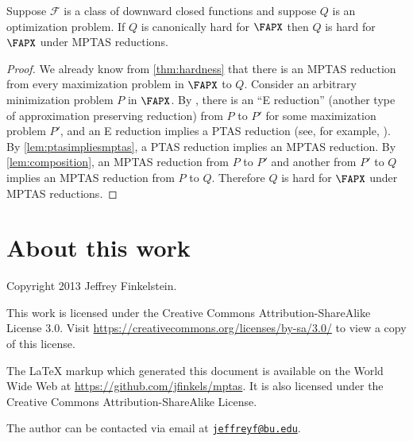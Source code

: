 \documentclass{article}
\newcommand{\email}[1]{\href{mailto:#1}{\nolinkurl{#1}}}
\begin{document}
\begin{corollary}[{\cite[Theorem~3]{ep06}}]
  Suppose $\mathcal{F}$ is a class of downward closed functions and suppose $Q$ is an optimization problem.
  If $Q$ is canonically hard for $\FAPX$ then $Q$ is hard for $\FAPX$ under MPTAS reductions.
\end{corollary}
\begin{proof}
  We already know from \autoref{thm:hardness} that there is an MPTAS reduction from every maximization problem in $\FAPX$ to $Q$.
  Consider an arbitrary minimization problem $P$ in $\FAPX$.
  By \cite{ep06}, there is an ``E reduction'' (another type of approximation preserving reduction) from $P$ to $P'$ for some maximization problem $P'$, and an E reduction implies a PTAS reduction (see, for example, \cite[Figure~2]{crescenzi97}).
  By \autoref{lem:ptasimpliesmptas}, a PTAS reduction implies an MPTAS reduction.
  By \autoref{lem:composition}, an MPTAS reduction from $P$ to $P'$ and another from $P'$ to $Q$ implies an MPTAS reduction from $P$ to $Q$.
  Therefore $Q$ is hard for $\FAPX$ under MPTAS reductions.
\end{proof}

\section*{About this work}

Copyright 2013 Jef{}frey Finkelstein.

This work is licensed under the Creative Commons Attribution-ShareAlike License 3.0.
Visit \mbox{\url{https://creativecommons.org/licenses/by-sa/3.0/}} to view a copy of this license.

The \LaTeX{} markup which generated this document is available on the World Wide Web at \mbox{\url{https://github.com/jfinkels/mptas}}.
It is also licensed under the Creative Commons Attribution-ShareAlike License.

The author can be contacted via email at \email{jeffreyf@bu.edu}.



\end{document}
